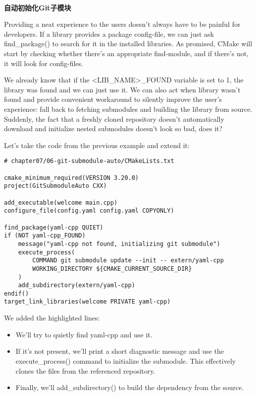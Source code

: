 \hspace*{\fill} \\ %
\noindent
\textbf{自动初始化Git子模块}

Providing a neat experience to the users doesn't always have to be painful for developers. If a library provides a package config-file, we can just ask find\_package() to search for it in the installed libraries. As promised, CMake will start by checking whether there's an appropriate find-module, and if there's not, it will look for config-files.

We already know that if the <LIB\_NAME>\_FOUND variable is set to 1, the library was found and we can just use it. We can also act when library wasn't found and provide convenient workaround to silently improve the user's experience: fall back to fetching submodules and building the library from source. Suddenly, the fact that a freshly cloned repository doesn't automatically download and initialize nested submodules doesn't look so bad, does it?

Let's take the code from the previous example and extend it:

\begin{lstlisting}[style=styleCMake]
# chapter07/06-git-submodule-auto/CMakeLists.txt

cmake_minimum_required(VERSION 3.20.0)
project(GitSubmoduleAuto CXX)

add_executable(welcome main.cpp)
configure_file(config.yaml config.yaml COPYONLY)

find_package(yaml-cpp QUIET)
if (NOT yaml-cpp_FOUND)
	message("yaml-cpp not found, initializing git submodule")
	execute_process(
		COMMAND git submodule update --init -- extern/yaml-cpp
		WORKING_DIRECTORY ${CMAKE_CURRENT_SOURCE_DIR}
	)
	add_subdirectory(extern/yaml-cpp)
endif()
target_link_libraries(welcome PRIVATE yaml-cpp)
\end{lstlisting}

We added the highlighted lines:

\begin{itemize}
\item 
We'll try to quietly find yaml-cpp and use it.

\item 
If it's not present, we'll print a short diagnostic message and use the execute\_process() command to initialize the submodule. This effectively clones the files from the referenced repository.

\item 
Finally, we'll add\_subdirectory() to build the dependency from the source.
\end{itemize}

